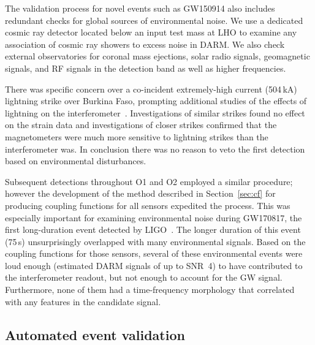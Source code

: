 The validation process for novel events such as GW150914 also includes redundant checks for global sources of environmental noise.
We use a dedicated cosmic ray detector located below an input test mass at \ac{LHO} to examine any association of cosmic ray showers to excess noise in \ac{DARM}.
We also check external observatories for coronal mass ejections, solar radio signals, geomagnetic signals, and \ac{RF} signals in the detection band as well as higher frequencies.

There was specific concern over a co-incident extremely-high current (504\,kA) lightning strike over Burkina Faso, prompting additional studies of the effects of lightning on the interferometer~\citep{Schofield_lightning}.
Investigations of similar strikes found no effect on the strain data and investigations of closer strikes confirmed that the magnetometers were much more sensitive to lightning strikes than the interferometer was.
In conclusion there was no reason to veto the first detection based on environmental disturbances.

Subsequent detections throughout \ac{O1} and \ac{O2} employed a similar procedure; however the development of the method described in Section~\ref{sec:cf} for producing coupling functions for all sensors expedited the process.
This was especially important for examining environmental noise during GW170817, the first long-duration event detected by \ac{LIGO}~\citep{gw170817, Schofield_170817}.
The longer duration of this event (75\,s) unsurprisingly overlapped with many environmental signals.
Based on the coupling functions for those sensors, several of these environmental events were loud enough (estimated \ac{DARM} signals of up to SNR~4) to have contributed to the interferometer readout, but not enough to account for the \ac{GW} signal.
Furthermore, none of them had a time-frequency morphology that correlated with any features in the candidate signal.

\subsection{Automated event validation}


